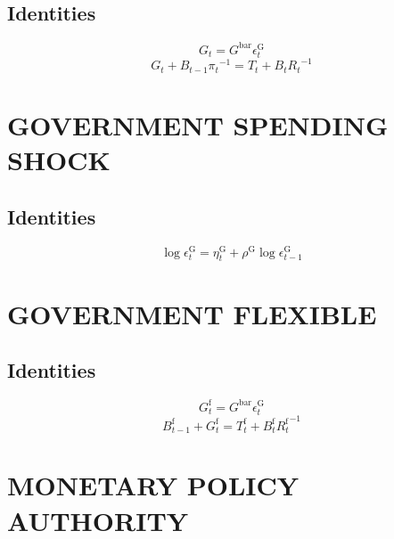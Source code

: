 \subsection{Identities}

\begin{equation}
G_{t} = {G^{\mathrm{bar}}} {\epsilon^{\mathrm{G}}_{t}}
\end{equation}
\begin{equation}
G_{t} + {B_{t-1}} {\pi_{t}}^{-1} = T_{t} + {B_{t}} {R_{t}}^{-1}
\end{equation}




\section{GOVERNMENT SPENDING SHOCK}

\subsection{Identities}

\begin{equation}
\log{\epsilon^{\mathrm{G}}_{t}} = \eta^{\mathrm{G}}_{t} + {\rho^{\mathrm{G}}} {\log{\epsilon^{\mathrm{G}}_{t-1}}}
\end{equation}




\section{GOVERNMENT FLEXIBLE}

\subsection{Identities}

\begin{equation}
G^{\mathrm{f}}_{t} = {G^{\mathrm{bar}}} {\epsilon^{\mathrm{G}}_{t}}
\end{equation}
\begin{equation}
B^{\mathrm{f}}_{t-1} + G^{\mathrm{f}}_{t} = T^{\mathrm{f}}_{t} + {B^{\mathrm{f}}_{t}} {R^{\mathrm{f}}_{t}}^{-1}
\end{equation}




\section{MONETARY POLICY AUTHORITY}


